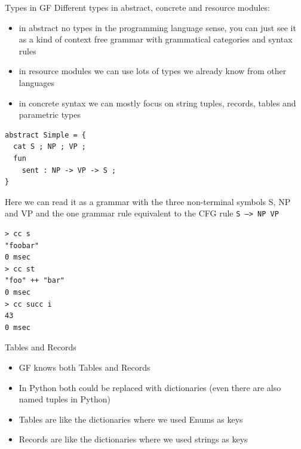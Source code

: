 \documentclass{beamer}
\begin{document}
\begin{frame}{Types in GF}
  Different types in abstract, concrete and resource modules:
  \begin{itemize}
  \item in abstract no types in the programming language sense, you can just see it as a kind of context free grammar with grammatical categories and syntax rules
  \item in resource modules we can use lots of types we already know from other languages
  \item in concrete syntax we can mostly focus on string tuples, records, tables and parametric types
  \end{itemize}
\end{frame}
\begin{frame}[fragile]
  \begin{lstlisting}
abstract Simple = {
  cat S ; NP ; VP ;
  fun
    sent : NP -> VP -> S ;
}
  \end{lstlisting}
  Here we can read it as a grammar with the three non-terminal symbols S, NP and VP and the one grammar rule equivalent to the CFG rule \texttt{S --> NP VP}
\end{frame}
\begin{frame}[fragile]
  
\begin{verbatim}
> cc s
"foobar"
0 msec
> cc st
"foo" ++ "bar"
0 msec
> cc succ i
43
0 msec
\end{verbatim}
\end{frame}

\begin{frame}{Tables and Records}
  \begin{itemize}
  \item GF knows both Tables and Records
  \item In Python both could be replaced with dictionaries (even there are also named tuples in Python)
  \item Tables are like the dictionaries where we used Enums as keys
  \item Records are like the dictionaries where we used strings as keys 
  \end{itemize}
\end{frame}
\end{document}
